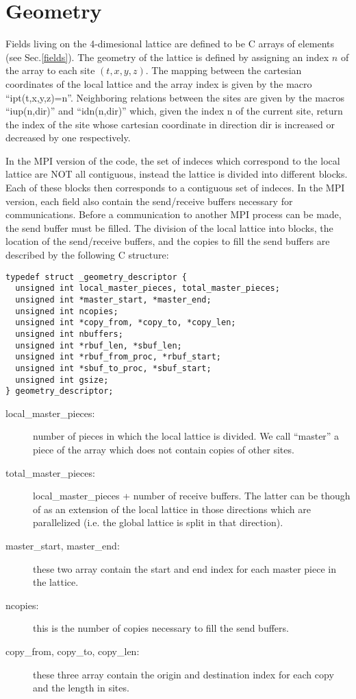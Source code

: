 \documentclass[10pt]{article}
\begin{document}
\section{Geometry}

Fields living on the 4-dimesional lattice are defined to be C arrays of elements (see Sec.\ref{fields}).
The geometry of the lattice is defined by assigning an index $n$ of the array to each site $(t,x,y,z)$. The mapping between the cartesian coordinates of the local lattice and the array index is given by the macro ``ipt(t,x,y,z)=n''. Neighboring relations between the sites are given by the macros ``iup(n,dir)'' and ``idn(n,dir)'' which, given the index n of the current site,  return the index of the site whose cartesian coordinate in direction dir is increased or decreased by one respectively.

In the MPI version of the code, the set of indeces which correspond to the local lattice are NOT all contiguous, instead the lattice is divided into different blocks. Each of these blocks then corresponds to a contiguous set of indeces. In the MPI version, each field also contain the send/receive buffers necessary for communications. Before a communication to another MPI process can be made, the send buffer must be filled.
The division of the local lattice into blocks, the location of the send/receive buffers, and the copies to fill the send buffers are described by the following C structure:

\begin{verbatim}
typedef struct _geometry_descriptor {
  unsigned int local_master_pieces, total_master_pieces;
  unsigned int *master_start, *master_end;
  unsigned int ncopies;
  unsigned int *copy_from, *copy_to, *copy_len;
  unsigned int nbuffers;
  unsigned int *rbuf_len, *sbuf_len;
  unsigned int *rbuf_from_proc, *rbuf_start;
  unsigned int *sbuf_to_proc, *sbuf_start;
  unsigned int gsize;
} geometry_descriptor;
\end{verbatim}

\begin{description}
\item[local\_master\_pieces:] number of pieces in which the local lattice is divided. We call ``master'' a piece of the array which does not contain copies of other sites.
\item[total\_master\_pieces:] local\_master\_pieces + number of receive buffers. The latter can be though of as an extension of the local lattice in those directions which are parallelized (i.e. the global lattice is split in that direction).
\item[master\_start, master\_end:] these two array contain the start and end index for each master piece in the lattice.
\item[ncopies:] this is the number of copies necessary to fill the send buffers.
\item[copy\_from, copy\_to, copy\_len:] these three array contain the origin and destination index for each copy and the length in sites.
\item[]
\end{description}
\end{document}
